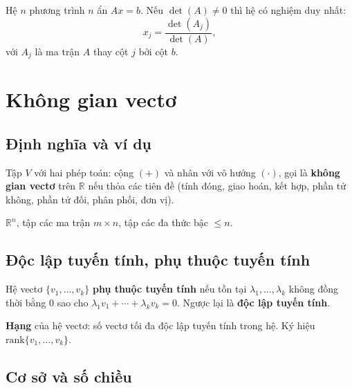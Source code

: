 \documentclass[12pt,a4paper]{article}
\begin{document}
\begin{dinhly}[title={Hệ Cramer}]
  Hệ $n$ phương trình $n$ ẩn $Ax = b$. Nếu $\det(A) \ne 0$ thì hệ có nghiệm duy nhất:
  \[
    x_j = \frac{\det(A_j)}{\det(A)},
  \]
  với $A_j$ là ma trận $A$ thay cột $j$ bởi cột $b$.
\end{dinhly}

\section{Không gian vectơ}

\subsection{Định nghĩa và ví dụ}

\begin{dinhnghia}
  Tập $V$ với hai phép toán: cộng $(+)$ và nhân với vô hướng $(\cdot)$, gọi là \textbf{không gian vectơ} trên $\mathbb{R}$ nếu thỏa các tiên đề (tính đóng, giao hoán, kết hợp, phần tử không, phần tử đối, phân phối, đơn vị).
\end{dinhnghia}

\begin{vidu}
  $\mathbb{R}^n$, tập các ma trận $m \times n$, tập các đa thức bậc $\le n$.
\end{vidu}

\subsection{Độc lập tuyến tính, phụ thuộc tuyến tính}

\begin{dinhnghia}
  Hệ vectơ $\{v_1, \ldots, v_k\}$ \textbf{phụ thuộc tuyến tính} nếu tồn tại $\lambda_1, \ldots, \lambda_k$ không đồng thời bằng 0 sao cho $\lambda_1 v_1 + \cdots + \lambda_k v_k = 0$. Ngược lại là \textbf{độc lập tuyến tính}.
\end{dinhnghia}

\begin{dinhnghia}
  \textbf{Hạng} của hệ vectơ: số vectơ tối đa độc lập tuyến tính trong hệ. Ký hiệu $\mathrm{rank}\{v_1, \ldots, v_k\}$.
\end{dinhnghia}

\subsection{Cơ sở và số chiều}
\end{document}
